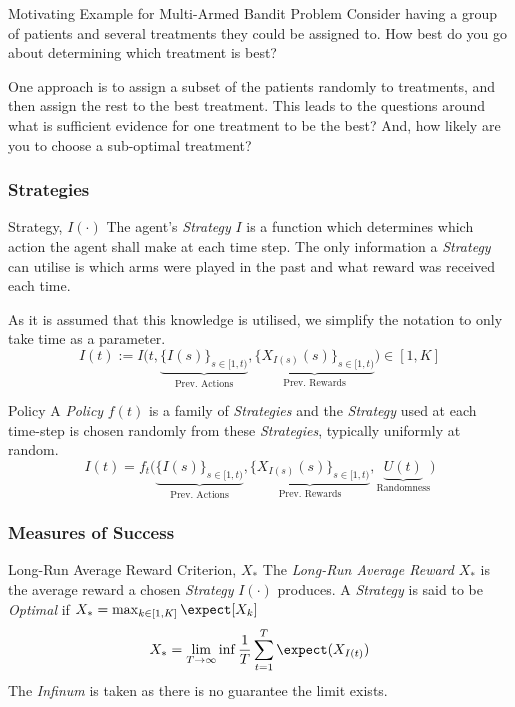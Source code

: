 \documentclass[11pt,a4paper]{article}
\begin{document}
  \begin{example}{Motivating Example for Multi-Armed Bandit Problem}
    Consider having a group of patients and several treatments they could be assigned to. How best do you go about determining which treatment is best?
    \par One approach is to assign a subset of the patients randomly to treatments, and then assign the rest to the best treatment. This leads to the questions around what is sufficient evidence for one treatment to be the best? And, how likely are you to choose a sub-optimal treatment?
  \end{example}

  \subsubsection*{Strategies}

  \begin{definition}{Strategy, $I(\cdot)$}
    The agent's \textit{Strategy} $I$ is a function which determines which action the agent shall make at each time step. The only information a \textit{Strategy} can utilise is which arms were played in the past and what reward was received each time.
    \par As it is assumed that this knowledge is utilised, we simplify the notation to only take time as a parameter.
    \[ I(t):=I\big(t,\underbrace{\{I(s)\}_{s\in[1,t)}}_\text{Prev. Actions},\underbrace{\{X_{I(s)}(s)\}_{s\in[1,t)}}_\text{Prev. Rewards}\big)\in[1,K] \]
  \end{definition}

  \begin{definition}{Policy}
    A \textit{Policy} $f(t)$ is a family of \textit{Strategies} and the \textit{Strategy} used at each time-step is chosen randomly from these \textit{Strategies}, typically uniformly at random.
    \[ I(t)=f_t\big(\underbrace{\{I(s)\}_{s\in[1,t)}}_\text{Prev. Actions},\underbrace{\{X_{I(s)}(s)\}_{s\in[1,t)}}_\text{Prev. Rewards},\underbrace{U(t)}_\text{Randomness}\big) \]
  \end{definition}

  \subsubsection*{Measures of Success}

  \begin{definition}{Long-Run Average Reward Criterion, $X_*$}
    The \textit{Long-Run Average Reward} $X_*$ is the average reward a chosen \textit{Strategy} $I(\cdot)$ produces. A \textit{Strategy} is said to be \textit{Optimal} if $X_*=\max_{k\in[1,K]}\expect[X_k]$
    \[ {\displaystyle X_*=\lim_{T\to\infty}\inf\frac1T\sum_{t=1}^T\expect(X_{I(t)})} \]
    The \textit{Infinum} is taken as there is no guarantee the limit exists.
  \end{definition}
\end{document}
